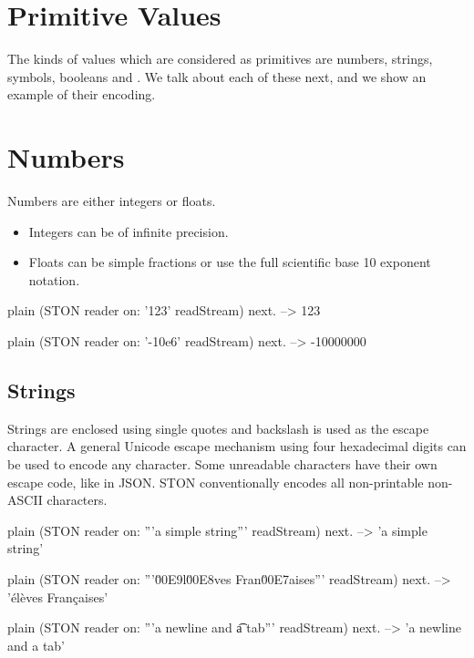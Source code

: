 \documentclass[10pt,twoside,english]{_support/latex/sbabook/sbabook}
\begin{document}
\section{Primitive Values}
The kinds of values which are considered as primitives are numbers, strings, symbols, booleans and . We talk about each of these next, and we show an
example of their encoding.
\section{Numbers}
Numbers are either integers or floats.

\begin{itemize}
\item Integers can be of infinite precision.
\item Floats can be simple fractions or use the full scientific base 10 exponent notation.
\end{itemize}

\begin{displaycode}{plain}
(STON reader on: '123' readStream) next.
   --> 123
\end{displaycode}

\begin{displaycode}{plain}
(STON reader on: '-10e6' readStream) next.
   --> -10000000
\end{displaycode}
\subsection{Strings}
Strings are enclosed using single quotes and backslash is used as the escape character.
A general Unicode escape mechanism using four hexadecimal digits can be used to encode any character. Some unreadable characters have their own escape code,
like in JSON.
STON conventionally encodes all non-printable non-ASCII characters.

\begin{displaycode}{plain}
(STON reader on: '''a simple string''' readStream) next.
   --> 'a simple string'
\end{displaycode}

\begin{displaycode}{plain}
(STON reader on: '''\u00E9l\u00E8ves Fran\u00E7aises''' readStream) next.
   --> 'élèves Françaises'
\end{displaycode}

\begin{displaycode}{plain}
(STON reader on: '''a newline \n and \t a tab''' readStream) next.
   -->
'a newline
 and     a tab'
\end{displaycode}
\end{document}
